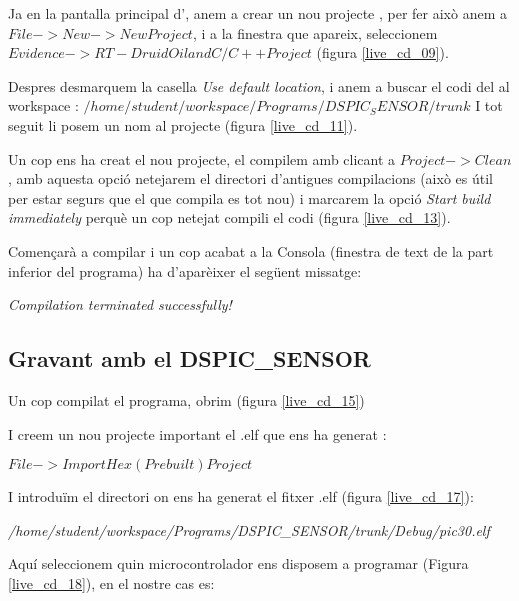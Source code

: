 Ja en la pantalla principal d'\Eclipse, anem a crear un nou projecte \RTDruid, per fer això anem a $File->New->New Project$, i a la finestra que apareix, seleccionem $Evidence->RT-Druid Oil and C/C++ Project$ (figura \ref{live_cd_09}).

Despres desmarquem la casella \emph{Use default location}, i anem a buscar el codi del \Sensor al workspace :
$/home/student/workspace/Programs/DSPIC_SENSOR/trunk$
I tot seguit li posem un nom al projecte (figura \ref{live_cd_11}).

Un cop ens ha creat el nou projecte, el compilem amb clicant a $Project->Clean$, amb aquesta opció netejarem el directori d'antigues compilacions (això es útil per estar segurs que el que compila es tot nou) i marcarem la opció \emph{Start build immediately} perquè un cop netejat compili el codi (figura \ref{live_cd_13}).

Començarà a compilar i un cop acabat a la Consola (finestra de text de la part inferior del programa) ha d'aparèixer el següent missatge:

\emph{Compilation terminated successfully!}


\subsection{Gravant amb \MplabX  el DSPIC\_SENSOR}\label{cap:gui:cd:sav:sensor}

Un cop compilat el programa, obrim \MplabX (figura \ref{live_cd_15})

I creem un nou projecte important el .elf que ens ha generat \Eclipse:

$File->Import Hex (Prebuilt) Project$

I introduïm el directori on ens ha generat el fitxer .elf (figura \ref{live_cd_17}):

\emph{/home/student/workspace/Programs/DSPIC\_SENSOR/trunk/Debug/pic30.elf}


Aquí seleccionem quin microcontrolador ens disposem a programar (Figura \ref{live_cd_18}), en el nostre cas es:

